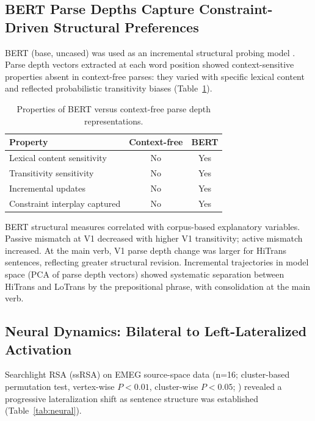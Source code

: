 \documentclass[11pt]{article}
\begin{document}
\subsection{BERT Parse Depths Capture Constraint-Driven Structural Preferences}

BERT (base, uncased) was used as an incremental structural probing model \citep{hewitt2019structural}. Parse depth vectors extracted at each word position showed context-sensitive properties absent in context-free parses: they varied with specific lexical content and reflected probabilistic transitivity biases (Table~\ref{tab:bert_props}).

\begin{table}[H]
\centering
\caption{Properties of BERT versus context-free parse depth representations.}
\label{tab:bert_props}
\begin{tabular}{lcc}
\toprule
\textbf{Property} & \textbf{Context-free} & \textbf{BERT} \\
\midrule
Lexical content sensitivity & No & Yes \\
Transitivity sensitivity & No & Yes \\
Incremental updates & No & Yes \\
Constraint interplay captured & No & Yes \\
\bottomrule
\end{tabular}
\end{table}

BERT structural measures correlated with corpus-based explanatory variables. Passive mismatch at V1 decreased with higher V1 transitivity; active mismatch increased. At the main verb, V1 parse depth change was larger for HiTrans sentences, reflecting greater structural revision. Incremental trajectories in model space (PCA of parse depth vectors) showed systematic separation between HiTrans and LoTrans by the prepositional phrase, with consolidation at the main verb.

\subsection{Neural Dynamics: Bilateral to Left-Lateralized Activation}

Searchlight RSA (ssRSA) on EMEG source-space data (n=16; cluster-based permutation test, vertex-wise $P < 0.01$, cluster-wise $P < 0.05$; \citealt{maris2007nonparametric}) revealed a progressive lateralization shift as sentence structure was established (Table~\ref{tab:neural}).
\end{document}

